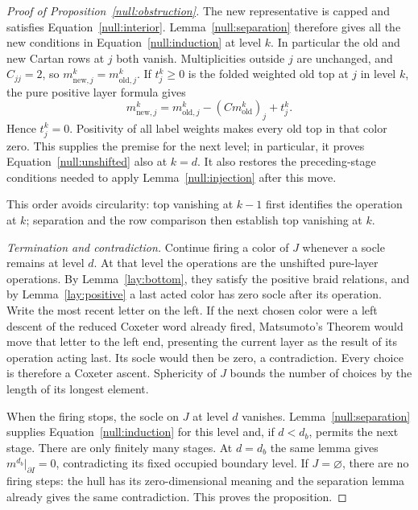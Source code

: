 \begin{proof}[Proof of Proposition~\ref{null:obstruction}]
The new representative is capped and satisfies
Equation~\eqref{null:interior}.  Lemma~\ref{null:separation} therefore
gives all the new conditions in Equation~\eqref{null:induction} at
level $k$.  In particular the old and new Cartan rows at $j$ both
vanish.  Multiplicities outside $j$ are unchanged, and $C_{jj}=2$,
so $m^k_{\mathrm{new},j}=m^k_{\mathrm{old},j}$.  If $t_j^k\ge0$
is the folded weighted old top at $j$ in level $k$, the pure positive
layer formula gives
\[
 m^k_{\mathrm{new},j}
   =m^k_{\mathrm{old},j}-(Cm^k_{\mathrm{old}})_j+t_j^k.
\]
Hence $t_j^k=0$.  Positivity of all label weights makes every old
top in that color zero.  This supplies the premise for the next
level; in particular, it proves Equation~\eqref{null:unshifted} also
at $k=d$.  It also restores the preceding-stage conditions needed
to apply Lemma~\ref{null:injection} after this move.

This order avoids circularity: top vanishing at $k-1$ first identifies
the operation at $k$; separation and the row comparison then establish
top vanishing at $k$.

\emph{Termination and contradiction.}
Continue firing a color of $J$ whenever a socle remains at level $d$.
At that level the operations are the unshifted pure-layer operations.
By Lemma~\ref{lay:bottom}, they satisfy the positive braid relations,
and by Lemma~\ref{lay:positive} a last acted color has zero socle
after its operation.  Write the most recent letter on the left.
If the next chosen color were a left descent of the reduced Coxeter
word already fired, Matsumoto's Theorem would move that letter to
the left end, presenting the current layer as the result of its
operation acting last.  Its socle would then be zero, a contradiction.
Every choice is therefore a Coxeter ascent.  Sphericity of $J$ bounds
the number of choices by the length of its longest element.

When the firing stops, the socle on $J$ at level $d$ vanishes.
Lemma~\ref{null:separation} supplies Equation~\eqref{null:induction}
for this level and, if $d<d_b$, permits the next stage.  There are
only finitely many stages.  At $d=d_b$ the same lemma gives
$m^{d_b}|_{\partial I}=0$, contradicting its fixed occupied boundary
level.  If $J=\varnothing$, there are no firing steps: the hull has
its zero-dimensional meaning and the separation lemma already gives
the same contradiction.  This proves the proposition.
\end{proof}
